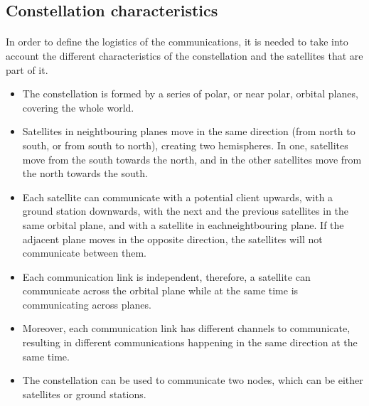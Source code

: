 \subsection{Constellation characteristics}
\paragraph{}In order to define the logistics of the communications, it is needed to take into account the different characteristics of the constellation and the satellites that are part of it.
\begin{itemize}
\item The constellation is formed by a series of polar, or near polar, orbital planes, covering the whole world.
\item Satellites in neightbouring planes move in the same direction (from north to south, or from south to north), creating two hemispheres. In one, satellites move from the south towards the north, and in the other satellites move from the north towards the south.
\item Each satellite can communicate with a potential client upwards, with a ground station downwards, with the next and the previous satellites in the same orbital plane, and with a satellite in eachneightbouring plane. If the adjacent plane moves in the opposite direction, the satellites will not communicate between them.
\item Each communication link is independent, therefore, a satellite can communicate across the orbital plane while at the same time is communicating across planes.
\item Moreover, each communication link has different channels to communicate, resulting in different communications happening in the same direction at the same time.
\item The constellation can be used to communicate two nodes, which can be either satellites or ground stations.
\end{itemize}

